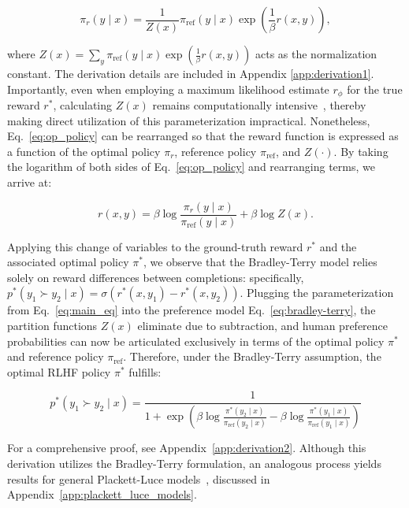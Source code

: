 \begin{equation}\label{eq:op_policy}
    \pi_r(y\mid x) = \frac{1}{Z(x)}\pi_\text{ref}(y\mid x)\exp\left(\frac{1}{\beta}r(x, y)\right),
\end{equation}

where $Z(x) =\sum_{y}\pi_\text{ref}(y\mid x)\exp\left(\frac{1}{\beta}r(x, y)\right)$ acts as the normalization constant. The derivation details are included in Appendix \ref{app:derivation1}. Importantly, even when employing a maximum likelihood estimate $r_{\phi}$ for the true reward $r^*$, calculating $Z(x)$ remains computationally intensive~\citep{korbak2022reinforcement, go2023aligning}, thereby making direct utilization of this parameterization impractical. Nonetheless, Eq.~\ref{eq:op_policy} can be rearranged so that the reward function is expressed as a function of the optimal policy $\pi_r$, reference policy $\pi_\text{ref}$, and $Z(\cdot)$. By taking the logarithm of both sides of Eq.~\ref{eq:op_policy} and rearranging terms, we arrive at:

\begin{equation}\label{eq:main_eq}
    r(x,y) =\beta \log \frac{\pi_r(y\mid x)}{\pi_\text{ref}(y\mid x)} + \beta \log Z(x).
\end{equation}

Applying this change of variables to the ground-truth reward $r^*$ and the associated optimal policy $\pi^*$, we observe that the Bradley-Terry model relies solely on reward differences between completions: specifically, ${p^*(y_1 \succ y_2 \mid x) = \sigma(r^*(x, y_1) - r^*(x, y_2))}$. Plugging the parameterization from Eq.~\ref{eq:main_eq} into the preference model Eq.~\ref{eq:bradley-terry}, the partition functions $Z(x)$ eliminate due to subtraction, and human preference probabilities can now be articulated exclusively in terms of the optimal policy $\pi^*$ and reference policy $\pi_\text{ref}$. Therefore, under the Bradley-Terry assumption, the optimal RLHF policy $\pi^*$ fulfills:

\begin{equation}\label{eq:objective}
    p^*(y_1\succ y_2 \mid x)=\frac{1}{1 + \exp\left(\beta \log \frac{\pi^*(y_2\mid x)}{\pi_\text{ref}(y_2\mid x)} - \beta \log \frac{\pi^*(y_1\mid x)}{\pi_\text{ref}(y_1\mid x)}\right)}
\end{equation}

For a comprehensive proof, see Appendix~\ref{app:derivation2}. Although this derivation utilizes the Bradley-Terry formulation, an analogous process yields results for general Plackett-Luce models~\citep{plackett1975analysis, luce2012individual}, discussed in Appendix~\ref{app:plackett_luce_models}.

